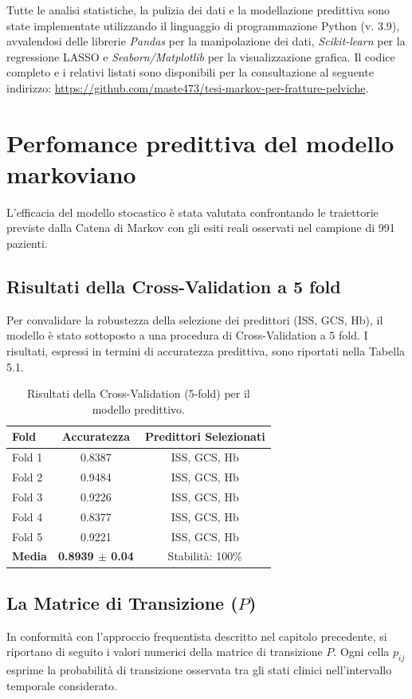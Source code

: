 \documentclass[11pt, oneside, noexaminfo]{sapthesis}   	%
\begin{document}
Tutte le analisi statistiche, la pulizia dei dati e la modellazione predittiva sono state implementate utilizzando il linguaggio di programmazione Python (v. 3.9), avvalendosi delle librerie \textit{Pandas} per la manipolazione dei dati, \textit{Scikit-learn} \cite{pedregosa2011sklearn} per la regressione LASSO e \textit{Seaborn/Matplotlib} per la visualizzazione grafica. Il codice completo e i relativi listati sono disponibili per la consultazione al seguente indirizzo: \url{https://github.com/maste473/tesi-markov-per-fratture-pelviche}.

\section{Perfomance predittiva del modello markoviano}
L'efficacia del modello stocastico è stata valutata confrontando le traiettorie previste dalla Catena di Markov con gli esiti reali osservati nel campione di 991 pazienti.

\subsection{Risultati della Cross-Validation a 5 fold}
Per convalidare la robustezza della selezione dei predittori (ISS, GCS, Hb), il modello è stato sottoposto a una procedura di Cross-Validation a 5 fold. I risultati, espressi in termini di accuratezza predittiva, sono riportati nella Tabella 5.1.

\begin{table}[h]
\centering
\caption{Risultati della Cross-Validation (5-fold) per il modello predittivo.}
\label{tab:cross_val}
\begin{tabular}{lcc}
\hline
\textbf{Fold} & \textbf{Accuratezza} & \textbf{Predittori Selezionati} \\ \hline
Fold 1 & 0.8387 & ISS, GCS, Hb \\
Fold 2 & 0.9484 & ISS, GCS, Hb \\
Fold 3 & 0.9226 & ISS, GCS, Hb \\
Fold 4 & 0.8377 & ISS, GCS, Hb \\
Fold 5 & 0.9221 & ISS, GCS, Hb \\ \hline
\textbf{Media} & \textbf{0.8939 $\pm$ 0.04} & {Stabilità: 100\%} \\ \hline
\end{tabular}
\end{table}

\subsection{La Matrice di Transizione ($P$)}
In conformità con l'approccio frequentista descritto nel capitolo precedente, si riportano di seguito i valori numerici della matrice di transizione $P$. Ogni cella $p_{ij}$ esprime la probabilità di transizione osservata tra gli stati clinici nell'intervallo temporale considerato.
\end{document}
